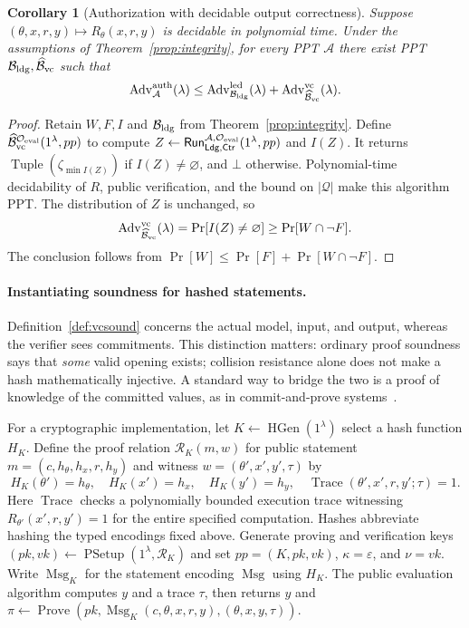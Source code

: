 \documentclass[10pt,letterpaper]{article}
\newtheorem{corollary}{Corollary}
\newcommand{\Msg}{\operatorname{Msg}}
\newcommand{\Ldg}{\mathsf{Ldg}}
\newcommand{\Ctr}{\mathsf{Ctr}}
\newcommand{\EvalO}{\mathcal O_{\rm eval}}
\begin{document}
\begin{corollary}[Authorization with decidable output correctness]
\label{cor:auth-tight}
Suppose $(\theta,x,r,y)\mapsto R_\theta(x,r,y)$ is decidable in polynomial time. Under the assumptions of Theorem~\ref{prop:integrity}, for every PPT $\mathcal A$ there exist PPT $\mathcal B_{\rm ldg},\widehat{\mathcal B}_{\rm vc}$ such that
\[
 \operatorname{Adv}^{\rm auth}_{\mathcal A}(\lambda)
 \leq\operatorname{Adv}^{\rm led}_{\mathcal B_{\rm ldg}}(\lambda)
       +\operatorname{Adv}^{\rm vc}_{\widehat{\mathcal B}_{\rm vc}}(\lambda).
\]
\end{corollary}
\begin{proof}
Retain $W,F,I$ and $\mathcal B_{\rm ldg}$ from Theorem~\ref{prop:integrity}. Define $\widehat{\mathcal B}_{\rm vc}^{\EvalO}(1^\lambda,pp)$ to compute $Z\leftarrow\mathsf{Run}_{\Ldg,\Ctr}^{\mathcal A,\EvalO}(1^\lambda,pp)$ and $I(Z)$. It returns $\operatorname{Tuple}(\zeta_{\min I(Z)})$ if $I(Z)\ne\varnothing$, and $\bot$ otherwise. Polynomial-time decidability of $R$, public verification, and the bound on $|\mathcal Q|$ make this algorithm PPT. The distribution of $Z$ is unchanged, so
\[
 \operatorname{Adv}^{\rm vc}_{\widehat{\mathcal B}_{\rm vc}}(\lambda)
 =\Pr[I(Z)\ne\varnothing]\geq\Pr[W\cap\neg F].
\]
The conclusion follows from $\Pr[W]\leq\Pr[F]+\Pr[W\cap\neg F]$.
\end{proof}

\paragraph{Instantiating soundness for hashed statements.}
Definition~\ref{def:vcsound} concerns the actual model, input, and output, whereas the verifier sees commitments. This distinction matters: ordinary proof soundness says that \emph{some} valid opening exists; collision resistance alone does not make a hash mathematically injective. A standard way to bridge the two is a proof of knowledge of the committed values, as in commit-and-prove systems~\citep{commitprove2020}.

For a cryptographic implementation, let $K\leftarrow\operatorname{HGen}(1^\lambda)$ select a hash function $H_K$. Define the proof relation $\mathcal R_K(m,w)$ for public statement $m=(c,h_\theta,h_x,r,h_y)$ and witness $w=(\theta',x',y',\tau)$ by
\begin{equation}
 H_K(\theta')=h_\theta,\quad H_K(x')=h_x,\quad H_K(y')=h_y,\quad
 \operatorname{Trace}(\theta',x',r,y';\tau)=1.
 \label{eq:proofrelation}
\end{equation}
Here $\operatorname{Trace}$ checks a polynomially bounded execution trace witnessing $R_{\theta'}(x',r,y')=1$ for the entire specified computation. Hashes abbreviate hashing the typed encodings fixed above. Generate proving and verification keys $(pk,vk)\leftarrow\operatorname{PSetup}(1^\lambda,\mathcal R_K)$ and set $pp=(K,pk,vk)$, $\kappa=\varepsilon$, and $\nu=vk$. Write $\Msg_K$ for the statement encoding $\Msg$ using $H_K$. The public evaluation algorithm computes $y$ and a trace $\tau$, then returns $y$ and $\pi\leftarrow\operatorname{Prove}(pk,\Msg_K(c,\theta,x,r,y),(\theta,x,y,\tau))$.
\end{document}
